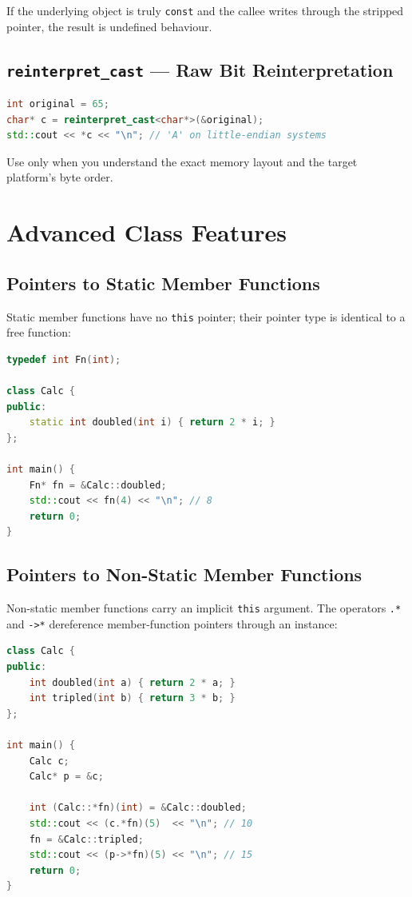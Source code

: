 If the underlying object is truly \texttt{const} and the callee writes through the stripped pointer, the result is undefined behaviour.

\subsection{\texttt{reinterpret\_cast} --- Raw Bit Reinterpretation}

\begin{lstlisting}[language=C++, caption={reinterpret\_cast for bit-level access}]
int original = 65;
char* c = reinterpret_cast<char*>(&original);
std::cout << *c << "\n"; // 'A' on little-endian systems
\end{lstlisting}

Use only when you understand the exact memory layout and the target platform's byte order.

\section{Advanced Class Features}
\label{sec:advanced-class}

\subsection{Pointers to Static Member Functions}

Static member functions have no \texttt{this} pointer; their pointer type is identical to a free function:

\begin{lstlisting}[language=C++, caption={Pointer to static member function}]
typedef int Fn(int);

class Calc {
public:
    static int doubled(int i) { return 2 * i; }
};

int main() {
    Fn* fn = &Calc::doubled;
    std::cout << fn(4) << "\n"; // 8
    return 0;
}
\end{lstlisting}

\subsection{Pointers to Non-Static Member Functions}

Non-static member functions carry an implicit \texttt{this} argument. The operators \texttt{.*} and \texttt{->*} dereference member-function pointers through an instance:

\begin{lstlisting}[language=C++, caption={Pointer to non-static member function}]
class Calc {
public:
    int doubled(int a) { return 2 * a; }
    int tripled(int b) { return 3 * b; }
};

int main() {
    Calc c;
    Calc* p = &c;

    int (Calc::*fn)(int) = &Calc::doubled;
    std::cout << (c.*fn)(5)  << "\n"; // 10
    fn = &Calc::tripled;
    std::cout << (p->*fn)(5) << "\n"; // 15
    return 0;
}
\end{lstlisting}

